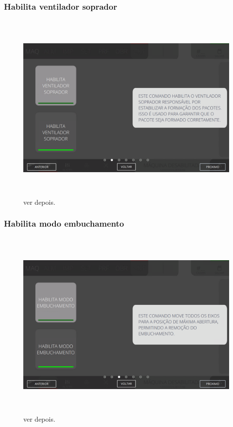 \newpage
\thispagestyle{fancy}
\vspace*{\fill}
\subsubsection{\small{Habilita ventilador soprador}}
\begin{figure}[h]
  \centering
  \includegraphics[width=576px,height=360px]{src/imagesFlexo/08-count/commands/e-2.png}
  \caption{ver depois.}
   \label{}
\end{figure}
\vspace*{\fill}

\newpage
\thispagestyle{fancy}
\vspace*{\fill}
\subsubsection{\small{Habilita modo embuchamento}}
\begin{figure}[h]
  \centering
  \includegraphics[width=576px,height=360px]{src/imagesFlexo/08-count/commands/e-3.png}
  \caption{ver depois.}
   \label{}
\end{figure}
\vspace*{\fill}

